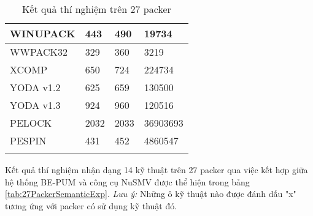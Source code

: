 \begin{small}
\begin{longtable}{|l|l|l|l|}
\hline 
WINUPACK							& 443				& 490				& 19734			\\
\hline 
WWPACK32							& 329				& 360				& 3219			\\
\hline 
XCOMP								& 650				& 724				& 224734		\\
\hline 
YODA v1.2							& 625				& 659				& 130500		\\
\hline 
YODA v1.3							& 924				& 960				& 120516		\\
\hline 
PELOCK								& 2032				& 2033				& 36903693		\\
\hline 
PESPIN								& 431				& 452				& 4860547		\\
\hline
\caption {Kết quả thí nghiệm trên 27 packer}\label{tab:27PackerExp}
\end{longtable}
\end{small}

\hspace{0.5cm}Kết quả thí nghiệm nhận dạng 14 kỹ thuật trên 27 packer qua việc kết hợp giữa hệ thống BE-PUM và công cụ NuSMV được thể hiện trong bảng \ref {tab:27PackerSemanticExp}. \textit{Lưu ý:} Những ô kỹ thuật nào được đánh dấu "x" tương ứng với packer có sử dụng kỹ thuật đó.

